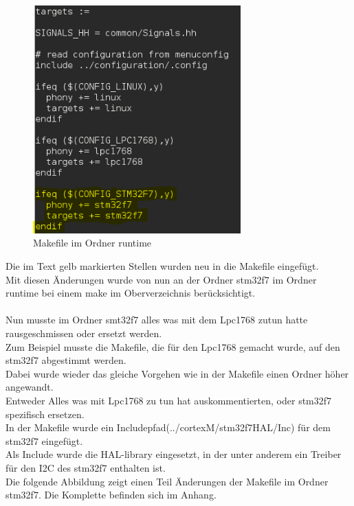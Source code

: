 \begin{figure}[h]
\begin{center}
\includegraphics[width=8cm]{grafiken/Makefile_runtime1.png}
\caption{Makefile im Ordner runtime}
\label{Makefile_runtime}
\end{center}
\end{figure}
\newpage
\noindent
Die im Text gelb markierten Stellen wurden neu in die Makefile eingefügt.\\
Mit diesen Änderungen wurde von nun an der Ordner stm32f7 im Ordner runtime bei einem make im Oberverzeichnis berücksichtigt.\\
\\
Nun musste im Ordner smt32f7 alles was mit dem Lpc1768 zutun hatte rausgeschmissen oder ersetzt werden.\\
Zum Beispiel musste die Makefile, die für den Lpc1768 gemacht wurde, auf den stm32f7 abgestimmt werden.\\
Dabei wurde wieder das gleiche Vorgehen wie in der Makefile einen Ordner höher angewandt.\\
Entweder Alles was mit Lpc1768 zu tun hat auskommentierten, oder stm32f7 spezifisch ersetzen.\\
In der Makefile wurde ein Includepfad(../cortexM/stm32f7HAL/Inc) für dem stm32f7 eingefügt.\\
Als Include wurde die HAL-library eingesetzt, in der unter anderem ein Treiber für den I2C des stm32f7 enthalten ist.\\ 
Die folgende Abbildung zeigt einen Teil Änderungen der Makefile im Ordner stm32f7. Die Komplette  befinden sich im Anhang.\newpage
